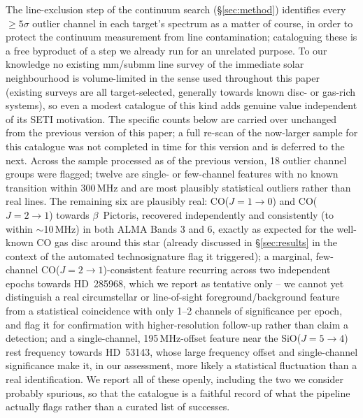 \documentclass{openjournal}
\begin{document}
The line-exclusion step of the continuum search (\S\ref{sec:method})
identifies every $\geq5\sigma$ outlier channel in each target's spectrum
as a matter of course, in order to protect the continuum measurement
from line contamination; cataloguing these is a free byproduct of a step
we already run for an unrelated purpose. To our knowledge no existing
mm/submm line survey of the immediate solar neighbourhood is
volume-limited in the sense used throughout this paper (existing surveys
are all target-selected, generally towards known disc- or gas-rich
systems), so even a modest catalogue of this kind adds genuine value
independent of its SETI motivation. The specific counts below are
carried over unchanged from the previous version of this paper; a full
re-scan of the now-larger sample for this catalogue was not completed in
time for this version and is deferred to the next. Across the sample
processed as of the previous version, 18 outlier channel groups were
flagged; twelve are single- or
few-channel features with no known transition within 300\,MHz and are
most plausibly statistical outliers rather than real lines. The
remaining six are plausibly real: CO($J{=}1\to0$) and CO($J{=}2\to1$)
towards $\beta$~Pictoris, recovered independently and consistently (to
within $\sim$10\,MHz) in both ALMA Bands 3 and 6, exactly as expected
for the well-known CO gas disc around this star (already discussed in
\S\ref{sec:results} in the context of the automated technosignature
flag it triggered); a marginal, few-channel CO($J{=}2\to1$)-consistent
feature recurring across two independent epochs towards HD~285968, which
we report as tentative only -- we cannot yet distinguish a real
circumstellar or line-of-sight foreground/background feature from a
statistical coincidence with only 1--2 channels of significance per
epoch, and flag it for confirmation with higher-resolution follow-up
rather than claim a detection; and a single-channel, 195\,MHz-offset
feature near the SiO($J{=}5\to4$) rest frequency towards HD~53143, whose
large frequency offset and single-channel significance make it, in our
assessment, more likely a statistical fluctuation than a real
identification. We report all of these openly, including the two we
consider probably spurious, so that the catalogue is a faithful record
of what the pipeline actually flags rather than a curated list of
successes.
\end{document}

